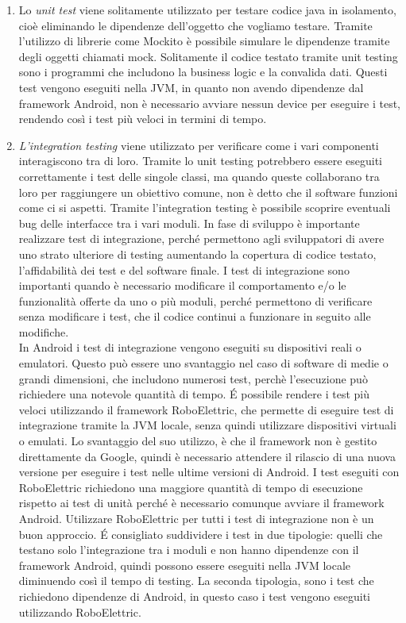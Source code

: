 \documentclass[12pt]{report}
\begin{document}
\begin{enumerate}
\item Lo \textit{unit test} viene solitamente utilizzato per testare codice java in isolamento, cioè eliminando le dipendenze dell'oggetto che vogliamo testare. Tramite l’utilizzo di librerie come Mockito è possibile simulare le dipendenze tramite degli oggetti chiamati mock. Solitamente il codice testato tramite unit testing sono i programmi che includono la business logic e la convalida dati. Questi test vengono eseguiti nella JVM, in quanto non avendo dipendenze dal framework Android, non è necessario avviare nessun device per eseguire i test, rendendo così i test più veloci in termini di tempo.

\item \textit{L’integration testing} viene utilizzato per verificare come i vari componenti interagiscono tra di loro. Tramite lo unit testing potrebbero essere eseguiti correttamente i test delle singole classi, ma quando queste collaborano tra loro per raggiungere un obiettivo comune, non è detto che il software funzioni come ci si aspetti. Tramite l’integration testing è possibile scoprire eventuali bug delle interfacce tra i vari moduli. In fase di sviluppo è importante realizzare test di integrazione, perché permettono agli sviluppatori di avere uno strato ulteriore di testing aumentando la copertura di codice testato, l’affidabilità dei test e del software finale. I test di integrazione sono importanti quando è necessario modificare il comportamento e/o le funzionalità offerte da uno o più moduli, perché permettono di verificare senza modificare i test, che il codice continui a funzionare in seguito alle modifiche.\\
In Android i test di integrazione vengono eseguiti su dispositivi reali o emulatori. Questo può essere uno svantaggio nel caso di software di medie o grandi dimensioni, che includono numerosi test, perchè l'esecuzione può richiedere una notevole quantità di tempo. %
É possibile rendere i test più veloci utilizzando il framework RoboElettric, che permette di eseguire test di integrazione tramite la JVM locale, senza quindi utilizzare dispositivi virtuali o emulati. Lo svantaggio del suo utilizzo, è che il framework non è gestito direttamente da Google, quindi è necessario attendere il rilascio di una nuova versione per eseguire i test nelle ultime versioni di Android. I test eseguiti con RoboElettric richiedono una maggiore quantità di tempo di esecuzione rispetto ai test di unità perché è necessario comunque avviare il framework Android. Utilizzare RoboElettric per tutti i test di integrazione non è un buon approccio. É consigliato suddividere i test in due tipologie: quelli che testano solo l’integrazione tra i moduli e non hanno dipendenze con il framework Android, quindi possono essere eseguiti nella JVM locale diminuendo così il tempo di testing. La seconda tipologia, sono i test che richiedono dipendenze di Android, in questo caso i test vengono eseguiti utilizzando RoboElettric.


\end{enumerate}
\end{document}
